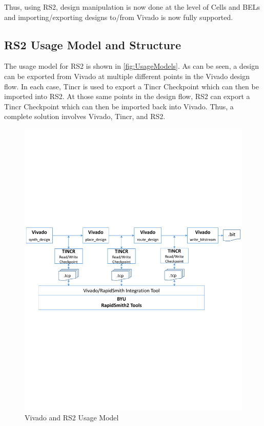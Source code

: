 \documentclass[10pt]{article}
\begin{document}
Thus, using RS2, design manipulation is now done at the level of Cells and BELs
and importing/exporting designs to/from Vivado is now fully supported.

\subsection{RS2 Usage Model and Structure}
The usage model for RS2 is shown in \autoref{fig:UsageModels}.  As can be
seen, a design can be exported from Vivado at multiple different points in the
Vivado design flow.  In each case, Tincr is used to export a Tincr Checkpoint
which can then be imported into RS2.  At those same points in the design flow,
RS2 can export a Tincr Checkpoint which can then be imported back into Vivado. 
Thus, a complete solution involves Vivado, Tincr, and RS2.

\begin{figure}[htb]
\centering
\includegraphics[width=\columnwidth]{UsageModels}
\caption{Vivado and RS2 Usage Model}
\label{fig:UsageModels}
\end{figure} 
\end{document}
